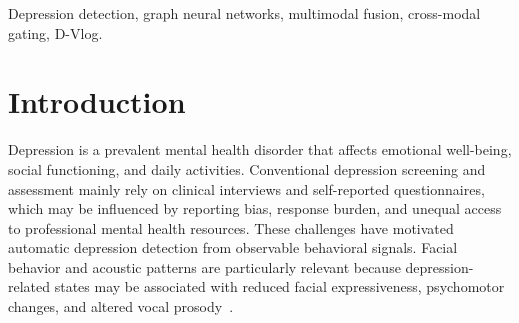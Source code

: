 \documentclass[conference]{IEEEtran}
\begin{document}
\begin{abstract}
Vlog-based depression detection aims to identify depression-related behavioral patterns from naturalistic social-media videos. However, such videos contain large variations in facial visibility, speaking style, audio quality, and recording environment, making sequential or global multimodal representations insufficient. This paper proposes an Action Unit-informed facial-audio graph learning framework for this task. The proposed framework organizes facial landmarks into an AU-informed spatio-temporal graph, where facial-topology edges model local relations within facial action-related regions and temporal edges capture landmark motion. Acoustic descriptors are represented as an audio temporal graph to model short-term acoustic continuity. Facial and acoustic graph representations are encoded by modality-specific graph attention networks and then integrated through bidirectional graph-level cross-modal gating. Experiments on D-Vlog show that the proposed method achieves an F1-score of 0.8077 and an AUC of 0.8041, outperforming existing reported methods under the evaluated metrics. Ablation studies demonstrate the contributions of temporal edges, self-loops, facial motion features, and graph-level gated fusion, while dynamic graph variants lead to clear performance degradation.
\end{abstract}

\begin{IEEEkeywords}
Depression detection, graph neural networks, multimodal fusion, cross-modal gating, D-Vlog.
\end{IEEEkeywords}

\section{Introduction}
\label{sec:intro}
Depression is a prevalent mental health disorder that affects emotional well-being, social functioning, and daily activities. Conventional depression screening and assessment mainly rely on clinical interviews and self-reported questionnaires, which may be influenced by reporting bias, response burden, and unequal access to professional mental health resources. These challenges have motivated automatic depression detection from observable behavioral signals. Facial behavior and acoustic patterns are particularly relevant because depression-related states may be associated with reduced facial expressiveness, psychomotor changes, and altered vocal prosody~\cite{cohn2009detecting,cummins2015review,yang2013vocal}. 
\end{document}
